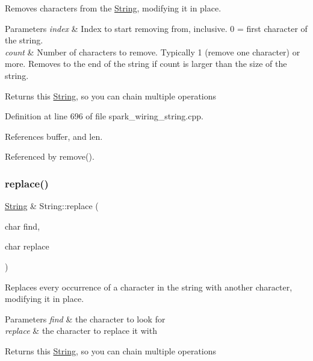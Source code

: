 Removes characters from the \hyperlink{class_string}{String}, modifying it in place. 


\begin{DoxyParams}{Parameters}
{\em index} & Index to start removing from, inclusive. 0 = first character of the string.\\
\hline
{\em count} & Number of characters to remove. Typically 1 (remove one character) or more. Removes to the end of the string if count is larger than the size of the string.\\
\hline
\end{DoxyParams}
\begin{DoxyReturn}{Returns}
this \hyperlink{class_string}{String}, so you can chain multiple operations 
\end{DoxyReturn}


Definition at line 696 of file spark\+\_\+wiring\+\_\+string.\+cpp.



References buffer, and len.



Referenced by remove().

\mbox{\label{class_string_a06f5fff85fe14f6369811383d915ca1a}} 
\subsubsection{\texorpdfstring{replace()}{replace()}\hspace{0.1cm}{\footnotesize\ttfamily [1/2]}}
{\footnotesize\ttfamily \hyperlink{class_string}{String} \& String\+::replace (\begin{DoxyParamCaption}\item[{char}]{find,  }\item[{char}]{replace }\end{DoxyParamCaption})}



Replaces every occurrence of a character in the string with another character, modifying it in place. 


\begin{DoxyParams}{Parameters}
{\em find} & the character to look for\\
\hline
{\em replace} & the character to replace it with\\
\hline
\end{DoxyParams}
\begin{DoxyReturn}{Returns}
this \hyperlink{class_string}{String}, so you can chain multiple operations 
\end{DoxyReturn}


